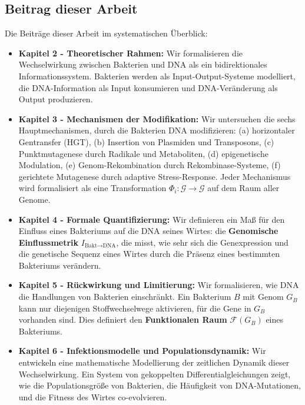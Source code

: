 \documentclass[a4paper,12pt]{article}
\theoremstyle{definition}
\begin{document}
\subsection{Beitrag dieser Arbeit}

Die Beiträge dieser Arbeit im systematischen Überblick:

\begin{itemize}
    \item \textbf{Kapitel 2 - Theoretischer Rahmen:} Wir formalisieren die Wechselwirkung zwischen Bakterien und DNA als ein bidirektionales Informationssystem. Bakterien werden als Input-Output-Systeme modelliert, die DNA-Information als Input konsumieren und DNA-Veränderung als Output produzieren.
    
    \item \textbf{Kapitel 3 - Mechanismen der Modifikation:} Wir untersuchen die sechs Hauptmechanismen, durch die Bakterien DNA modifizieren: (a) horizontaler Gentransfer (HGT), (b) Insertion von Plasmiden und Transposons, (c) Punktmutagenese durch Radikale und Metaboliten, (d) epigenetische Modulation, (e) Genom-Rekombination durch Rekombinase-Systeme, (f) gerichtete Mutagenese durch adaptive Stress-Response. Jeder Mechanismus wird formalisiert als eine Transformation $\Phi_i: \mathcal{G} \to \mathcal{G}$ auf dem Raum aller Genome.
    
    \item \textbf{Kapitel 4 - Formale Quantifizierung:} Wir definieren ein Maß für den Einfluss eines Bakteriums auf die DNA seines Wirtes: die \textbf{Genomische Einflussmetrik} $I_{\text{Bakt} \to \text{DNA}}$, die misst, wie sehr sich die Genexpression und die genetische Sequenz eines Wirtes durch die Präsenz eines bestimmten Bakteriums verändern.
    
    \item \textbf{Kapitel 5 - Rückwirkung und Limitierung:} Wir formalisieren, wie DNA die Handlungen von Bakterien einschränkt. Ein Bakterium $B$ mit Genom $G_B$ kann nur diejenigen Stoffwechselwege aktivieren, für die Gene in $G_B$ vorhanden sind. Dies definiert den \textbf{Funktionalen Raum} $\mathcal{F}(G_B)$ eines Bakteriums.
    
    \item \textbf{Kapitel 6 - Infektionsmodelle und Populationsdynamik:} Wir entwickeln eine mathematische Modellierung der zeitlichen Dynamik dieser Wechselwirkung. Ein System von gekoppelten Differentialgleichungen zeigt, wie die Populationsgröße von Bakterien, die Häufigkeit von DNA-Mutationen, und die Fitness des Wirtes co-evolvieren.
    

\end{itemize}
\end{document}

